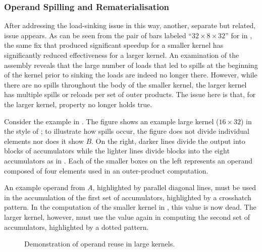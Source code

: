 \documentclass[\main/thesis.tex]{subfiles}
\begin{document}
\subsubsection{Operand Spilling and Rematerialisation}
After addressing the load-sinking issue in this way, another, separate but related, issue appears.
As can be seen from the pair of bars labeled ``$32 \times 8 \times 32$'' for  in , the same fix that produced significant speedup for a smaller kernel has significantly reduced effectiveness for a larger kernel.
An examination of the assembly reveals that the large number of loads that led to \glspl{spill} at the beginning of the kernel prior to sinking the loads are indeed no longer there.
However, while there are no \glspl{spill} throughout the body of the smaller kernel, the larger kernel has multiple \glspl{spill} or reloads per set of outer products.
The issue here is that, for the larger kernel, property  no longer holds true.

Consider the example in .
The figure shows an example large kernel ($16 \times 32$) in the style of ; to illustrate how \glspl{spill} occur, the figure does not divide individual elements nor does it show $B$.
On the right, darker lines divide the output into blocks of accumulators while the lighter lines divide blocks into the eight accumulators as in .
Each of the smaller boxes on the left represents an operand composed of four  elements used in an outer-product computation.

An example operand from $A$, highlighted by parallel diagonal lines, must be used in the accumulation of the first set of accumulators, highlighted by a crosshatch pattern.
In the computation of the smaller kernel in , this value is now \gls{dead}.
The larger kernel, however, must use the value again in computing the second set of accumulators, highlighted by a dotted pattern.

\begin{figure}[t]
  \centering
  \caption[Large Kernel Operand Reuse]{Demonstration of operand reuse in large kernels.}
  \label{fig:opReuse}
\end{figure}
\end{document}
